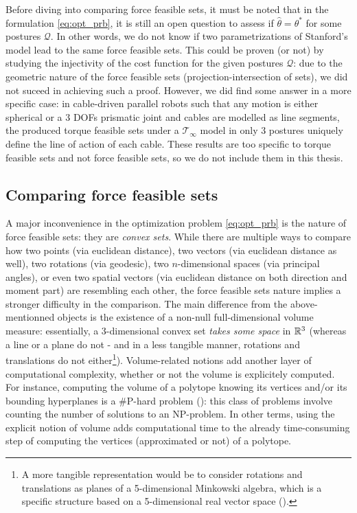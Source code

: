 Before diving into comparing force feasible sets, it must be noted that in the formulation \ref{eq:opt_prb}, it is still an open question to assess if $\hat{\theta} = \theta^*$ for some postures $\mathcal{Q}$. In other words, we do not know if two parametrizations of Stanford's model lead to the same force feasible sets. This could be proven (or not) by studying the injectivity of the cost function for the given postures $\mathcal{Q}$: due to the geometric nature of the force feasible sets (projection-intersection of sets), we did not suceed in achieving such a proof. 
However, we did find some answer in a more specific case: in cable-driven parallel robots such that any motion is either spherical or a 3 DOFs prismatic joint and cables are modelled as line segments, the produced torque feasible sets under a $\mathcal{T}_{\infty}$ model in only 3 postures uniquely define the line of action of each cable. These results are too specific to torque feasible sets and not force feasible sets, so we do not include them in this thesis.


\subsection{Comparing force feasible sets}
\label{subsec:comparing_ffs}
A major inconvenience in the optimization problem \ref{eq:opt_prb} is the nature of force feasible sets: they are \emph{convex sets}. While there are multiple ways to compare how two points (via euclidean distance), two vectors (via euclidean distance as well), two rotations (via geodesic), two $n$-dimensional spaces (via principal angles), or even two spatial vectors (via euclidean distance on both direction and moment part) are resembling each other, the force feasible sets nature implies a stronger difficulty in the comparison. The main difference from the above-mentionned objects is the existence of a non-null full-dimensional volume measure: essentially, a 3-dimensional convex set \emph{takes some space} in $\mathbb{R}^3$ (whereas a line or a plane do not - and in a less tangible manner, rotations and translations do not either\footnote{A more tangible representation would be to consider rotations and translations as planes of a 5-dimensional Minkowski algebra, which is a specific structure based on a 5-dimensional real vector space (\cite{dorstGeometricAlgebraComputer2007}).}). Volume-related notions add another layer of computational complexity, whether or not the volume is explicitely computed. For instance, computing the volume of a polytope knowing its vertices and/or its bounding hyperplanes is a \#P-hard problem (\cite{dyerComplexityComputingVolume1988}): this class of problems involve counting the number of solutions to an NP-problem. In other terms, using the explicit notion of volume adds computational time to the already time-consuming step of computing the vertices (approximated or not) of a polytope.

